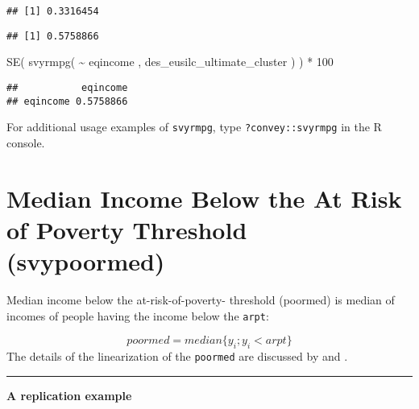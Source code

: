 \documentclass[
]{book}
\newenvironment{Shaded}{\begin{snugshade}}{\end{snugshade}}
\newcommand{\CommentTok}[1]{\textcolor[rgb]{0.56,0.35,0.01}{\textit{#1}}}
\newcommand{\DecValTok}[1]{\textcolor[rgb]{0.00,0.00,0.81}{#1}}
\newcommand{\FunctionTok}[1]{\textcolor[rgb]{0.00,0.00,0.00}{#1}}
\newcommand{\NormalTok}[1]{#1}
\newcommand{\SpecialCharTok}[1]{\textcolor[rgb]{0.00,0.00,0.00}{#1}}
\begin{document}
\begin{verbatim}
## [1] 0.3316454
\end{verbatim}

\begin{Shaded}
\end{Shaded}

\begin{verbatim}
## [1] 0.5758866
\end{verbatim}

\begin{Shaded}
\begin{Highlighting}[]
\FunctionTok{SE}\NormalTok{( }\FunctionTok{svyrmpg}\NormalTok{( }\SpecialCharTok{\textasciitilde{}}\NormalTok{ eqincome , des\_eusilc\_ultimate\_cluster ) ) }\SpecialCharTok{*} \DecValTok{100}
\end{Highlighting}
\end{Shaded}

\begin{verbatim}
##           eqincome
## eqincome 0.5758866
\end{verbatim}

For additional usage examples of \texttt{svyrmpg}, type \texttt{?convey::svyrmpg} in the R console.

\hypertarget{median-income-below-the-at-risk-of-poverty-threshold-svypoormed}{%
\section{Median Income Below the At Risk of Poverty Threshold (svypoormed)}\label{median-income-below-the-at-risk-of-poverty-threshold-svypoormed}}

Median income below the at-risk-of-poverty- threshold (poormed) is median of incomes of people having the income below the \texttt{arpt}:

\[
poormed = median\{y_i; y_i< arpt\}
\]
The details of the linearization of the \texttt{poormed} are discussed by \textcite{deville1999} and \textcite{osier2009}.

\begin{center}\rule{0.5\linewidth}{0.5pt}\end{center}

\textbf{A replication example}
\end{document}
